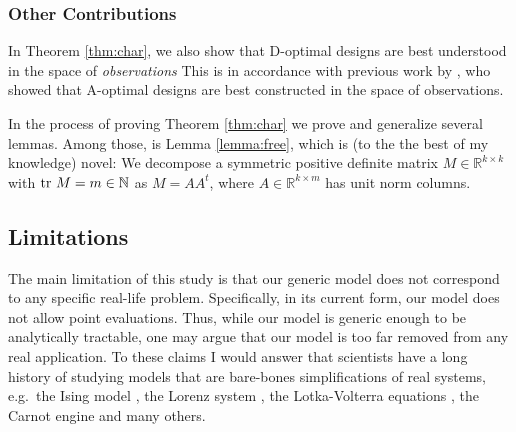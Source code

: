 \subsubsection{Other Contributions}
In Theorem \ref{thm:char}, we also show that D-optimal designs are
best understood in the space of \emph{observations}
This is in accordance with previous work by \citet{koval2020}, who
showed that A-optimal designs are best constructed in the space of
observations.

In the process of proving Theorem \ref{thm:char} we prove and
generalize several lemmas. Among those, is Lemma \ref{lemma:free},
which is (to the the best of my knowledge) novel: We decompose a
symmetric positive definite matrix \(M \in \mathbb{R}^{k \times k}\)
with \(\textup{tr}\ M = m \in \mathbb{N}\) as \(M = AA^t\), where \(A\in
\mathbb{R}^{k \times m}\) has unit norm columns.


\subsection{Limitations}\label{subsec:limitations}
The main limitation of this study is that our generic model does not
correspond to any specific real-life problem. Specifically, in its
current form, our model does not allow point evaluations. Thus, while
our model is generic enough to be analytically tractable, one may
argue that our model is too far removed from any real application. To
these claims I would answer that scientists have a long history of
studying models that are bare-bones simplifications of real systems,
e.g.~the Ising model \citet{cipra1987}, the Lorenz system \citet{brin},
the Lotka-Volterra equations \citet{logan2006}, the Carnot engine
\citet{kardar2007} and many others.
